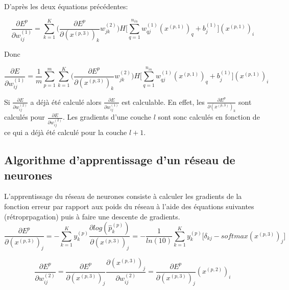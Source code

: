 \documentclass[a4paper,11pt,oneside,roman]{article}
\begin{document}
    D'après les deux équations précédentes:

    \begin{equation}
        \frac{\partial E^p}{\partial w_{ij}^{(1)}} = \sum\limits_{k=1}^{K} \Big(\frac{\partial E^p}{\partial (x^{(p,3)})_k} w_{jk}^{(2)}\Big) H\big[\sum\limits_{q=1}^{n_{in}} w_{qj}^{(1)}(x^{(p,1)})_{q} + b_j^{(1)}\big] (x^{(p,1)})_i
    \end{equation}

    Donc

    \begin{equation}
        \frac{\partial E}{\partial w_{ij}^{(1)}} = \frac{1}{m}\sum\limits_{p=1}^{m}\sum\limits_{k=1}^{K} \Big(\frac{\partial E^p}{\partial (x^{(p,3)})_k} w_{jk}^{(2)}\Big) H\big[\sum\limits_{q=1}^{n_{in}} w_{qj}^{(1)}(x^{(p,1)})_{q} + b_j^{(1)}\big] (x^{(p,1)})_i
        \label{backprop}
    \end{equation}

    Si $\frac{\partial E}{\partial w_{ij}^{(2)}}$ a déjà été calculé alors $\frac{\partial E}{\partial w_{ij}^{(1)}}$ est calculable. En effet, les $\frac{\partial E^p}{\partial (x^{(p,3)})_k}$ sont calculés pour $\frac{\partial E}{\partial w_{ij}^{(2)}}$.
    Les gradients d'une couche $l$ sont sonc calculés en fonction de ce qui a déjà été calculé pour la couche $l+1$.

    \subsection{Algorithme d'apprentissage d'un réseau de neurones}

    L'apprentissage du réseau de neurones consiste à calculer les gradients de la fonction erreur par rapport aux poids du réseau à l'aide des équations suivantes (rétroprpagation) puis à faire une descente de gradients.
    \begin{equation}
        \frac{\partial E^p}{\partial (x^{(p,3)})_{j}} = -\sum\limits_{k=1}^{K} y_k^{(p)} \frac{\partial log(\hat{p}_{k}^{(p)})}{\partial (x^{(p,3)})_{j}} = - \frac{1}{ln(10)} \sum\limits_{k=1}^{K} y_k^{(p)} \bigg[ \delta_{kj} - softmax(x^{(p,3)})_j \bigg]
    \end{equation}

    \begin{equation}
        \frac{\partial E^p}{\partial w_{ij}^{(2)}} = \frac{\partial E^p}{\partial (x^{(p,3)})_{j}} \frac{\partial (x^{(p,3)})_{j}}{\partial w_{ij}^{(2)}} = \frac{\partial E^p}{\partial (x^{(p,3)})_{j}} (x^{(p,2)})_i
    \end{equation}
\end{document}
